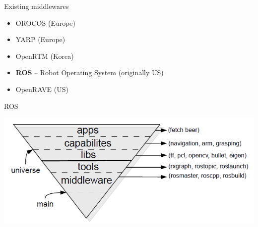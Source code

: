 \documentclass[compress]{beamer}
\begin{document}
\begin{frame}{Existing middlewares}
    \begin{itemize}
        \item OROCOS (Europe)
        \item YARP (Europe)
        \item OpenRTM (Korea)
        \item \textbf<2>{ROS} -- Robot Operating System (originally US)
        \item OpenRAVE (US)
    \end{itemize}
\end{frame}

\begin{frame}{ROS}

    \begin{center}
        \includegraphics[width=\linewidth]{ros_structure}
    \end{center}
\end{frame}
\end{document}
